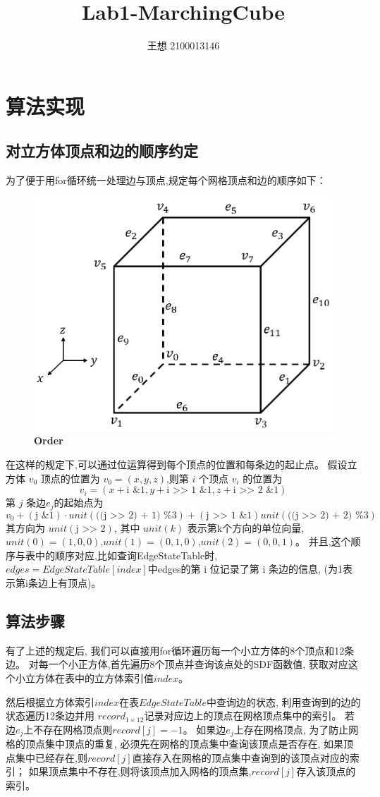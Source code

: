 \documentclass{ctexart}
\title{Lab1-MarchingCube}
\author{王想 2100013146}
\date{}
\begin{document}
\maketitle

\section{算法实现}
\subsection{对立方体顶点和边的顺序约定}
为了便于用for循环统一处理边与顶点,规定每个网格顶点和边的顺序如下：
\begin{figure}[htbp]
    \centering
    \includegraphics[width=0.5\linewidth]{figures/order.png}
    \caption{\textbf{Order}}
\end{figure}

在这样的规定下,可以通过位运算得到每个顶点的位置和每条边的起止点。
假设立方体 $v_0$ 顶点的位置为 $v_0 = (x, y, z)$,则第 $i$ 个顶点 $v_i$ 的位置为
$$v_i = (x + \text{i \& 1}, y + \text{i >> 1 \& 1}, z + \text{i >> 2 \& 1})$$
第 $j$ 条边$e_j$的起始点为
$$v_0 + (\text{j \& 1}) \cdot unit(\text{((j >> 2) + 1) \% 3}) + (\text{j >> 1 \& 1}) unit(\text{((j >> 2) + 2) \% 3})$$
其方向为
$unit(\text{j >> 2})$,
其中 $unit(k)$ 表示第k个方向的单位向量,
$unit(0) = (1, 0, 0)$,$unit(1) = (0, 1, 0)$,$unit(2) = (0, 0, 1)$。
并且,这个顺序与表中的顺序对应,比如查询EdgeStateTable时,
$edges = EdgeStateTable[index]$中edges的第 i 位记录了第 i 条边的信息,
(为1表示第i条边上有顶点)。



\subsection{算法步骤}
有了上述的规定后,
我们可以直接用for循环遍历每一个小立方体的8个顶点和12条边。
对每一个小正方体,首先遍历8个顶点并查询该点处的SDF函数值,
获取对应这个小立方体在表中的立方体索引值$index$。

然后根据立方体索引$index$在表$EdgeStateTable$中查询边的状态,
利用查询到的边的状态遍历12条边并用
$record_{1\times12}$记录对应边上的顶点在网格顶点集中的索引。
若边$e_j$上不存在网格顶点则$record[j]=-1$。
如果边$e_j$上存在网格顶点,
为了防止网格的顶点集中顶点的重复,
必须先在网格的顶点集中查询该顶点是否存在,
如果顶点集中已经存在,则$record[j]$直接存入在网格的顶点集中查询到的该顶点对应的索引；
如果顶点集中不存在,则将该顶点加入网格的顶点集,$record[j]$存入该顶点的索引。
\end{document}
